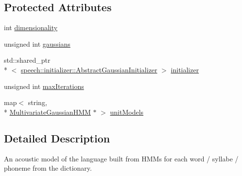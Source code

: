 \subsection*{Protected Attributes}
\begin{DoxyCompactItemize}
\item 
int \hyperlink{classspeech_1_1HMMLexicon_a0e8247e6ee089aced3287ec0488e927b}{dimensionality}
\item 
unsigned int \hyperlink{classspeech_1_1HMMLexicon_a31c5dc5af41ea8a1f7ef825b2581b4d6}{gaussians}
\item 
std\+::shared\+\_\+ptr\\*
$<$ \hyperlink{classspeech_1_1initializer_1_1AbstractGaussianInitializer}{speech\+::initializer\+::\+Abstract\+Gaussian\+Initializer} $>$ \hyperlink{classspeech_1_1HMMLexicon_a12d561355a3c03df3d6500c422c1b821}{initializer}
\item 
unsigned int \hyperlink{classspeech_1_1HMMLexicon_a4f7a5e08c169ca9f5a389f25c6fc5972}{max\+Iterations}
\item 
map$<$ string, \\*
\hyperlink{classspeech_1_1HMMLexicon_1_1MultivariateGaussianHMM}{Multivariate\+Gaussian\+H\+M\+M} $\ast$ $>$ \hyperlink{classspeech_1_1HMMLexicon_aee3322e49c63383316eb46e489d81de9}{unit\+Models}
\end{DoxyCompactItemize}


\subsection{Detailed Description}
An acoustic model of the language built from H\+M\+Ms for each word / syllabe / phoneme from the dictionary. 

